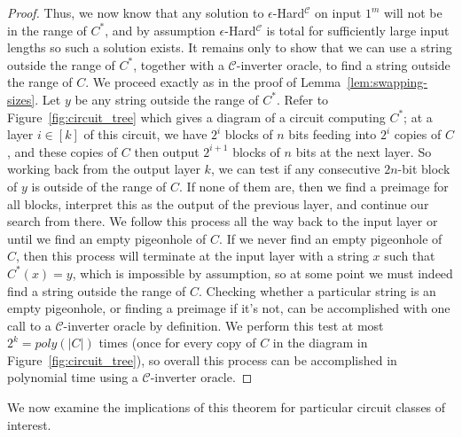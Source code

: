 \documentclass[11pt]{article}
\begin{document}
\begin{proof}
 Thus, we now know that any solution to  {\sc $\epsilon$-Hard}$^{\mathcal{C}}$ on input $1^m$ will not be in the range of $C^*$, and by assumption {\sc $\epsilon$-Hard}$^{\mathcal{C}}$ is total for sufficiently large input lengths so such a solution exists. It remains only to show that we can use a string outside the range of $C^*$, together with a $\mathcal{C}$-inverter oracle, to find a string outside the range of $C$. We proceed exactly as in the proof of Lemma~\ref{lem:swapping-sizes}. Let $y$ be any string outside the range of $C^*$. Refer to Figure~\ref{fig:circuit_tree} which gives a diagram of a circuit computing $C^*$; at a layer $i \in [k]$ of this circuit, we have $2^i$ blocks of $n$ bits feeding into $2^i$ copies of $C$, and these copies of $C$ then output $2^{i+1}$ blocks of $n$ bits at the next layer. So working back from the output layer $k$, we can test if any consecutive $2n$-bit block of $y$ is outside of the range of $C$. If none of them are, then we find a preimage for all blocks, interpret this as the output of the previous layer, and continue our search from there. We follow this process all the way back to the input layer or until we find an empty pigeonhole of $C$. If we never find an empty pigeonhole of $C$, then this process will terminate at the input layer with a string $x$ such that $C^*(x) = y$, which is impossible by assumption, so at some point we must indeed find a string outside the range of $C$. Checking whether a particular string is an empty pigeonhole, or finding a preimage if it's not, can be accomplished with one call to a $\mathcal{C}$-inverter oracle by definition. We perform this test at most $2^k = poly(|C|)$ times (once for every copy of $C$ in the diagram in Figure~\ref{fig:circuit_tree}), so overall this process can be accomplished in polynomial time using a $\mathcal{C}$-inverter oracle.
\end{proof}

We now examine the implications of this theorem for particular circuit classes of interest.
\end{document}
